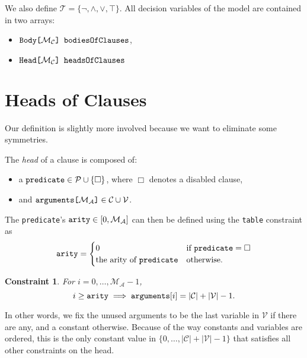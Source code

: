 \documentclass[runningheads]{llncs}
\newtheorem{constraint}{Constraint}
\newcommand{\variable}[1]{\texttt{\textup{#1}}}
\newcommand{\arrayd}[3]{\variable{{#1}[}{#2}\variable{]} \in {#3}}
\newcommand{\arrayt}[3]{\variable{{#3}[}{#2}\variable{] {#1}}}
\newcommand{\predicates}{\mathcal{P}}
\newcommand{\variables}{\mathcal{V}}
\newcommand{\constants}{\mathcal{C}}
\newcommand{\tokens}{\mathcal{T}}
\newcommand{\maxArity}{\mathcal{M}_{\mathcal{A}}}
\newcommand{\maxNumClauses}{\mathcal{M}_{\mathcal{C}}}
\begin{document}
We also define $\tokens{} = \{ \neg, \land, \lor, \top \}$. All decision
variables of the model are contained in two arrays:
\begin{itemize}
\item $\arrayt{bodiesOfClauses}{\maxNumClauses{}}{Body}$,
\item $\arrayt{headsOfClauses}{\maxNumClauses{}}{Head}$
\end{itemize}

\section{Heads of Clauses}

Our definition is slightly more involved because we want to eliminate some
symmetries.

\begin{definition}
  The \emph{head} of a clause is composed of:
  \begin{itemize}
  \item a $\variable{predicate} \in \predicates \cup \{ \Box \}$, where $\Box$
    denotes a disabled clause,
  \item and $\arrayd{arguments}{\maxArity{}}{\constants{} \cup \variables{}}$.
  \end{itemize}
\end{definition}

\begin{definition}
  The \variable{predicate}'s $\variable{arity} \in [0, \maxArity{}]$ can then be
  defined using the \variable{table} constraint as
  \[
    \variable{arity} = \begin{cases}
      0 & \text{if } \variable{predicate} = \Box\\
      \text{the arity of } \variable{predicate} & \text{otherwise.}
    \end{cases}
  \]
\end{definition}

\begin{constraint}
  For $i = 0, \dots, \maxArity{} - 1$,
  \[
    i \ge \variable{arity} \implies \variable{arguments}[i] = |\constants{}| +
    |\variables{}| - 1.
  \]
\end{constraint}
In other words, we fix the unused arguments to be the last variable in
$\variables{}$ if there are any, and a constant otherwise. Because of the way
constants and variables are ordered, this is the only constant value in $\{ 0,
\dots, |\constants{}| + |\variables{}| - 1 \}$ that satisfies all other
constraints on the head.
\end{document}
